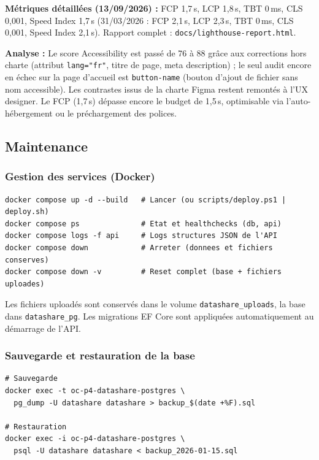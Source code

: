 \documentclass[12pt,a4paper]{article}
\begin{document}
\textbf{M\'etriques d\'etaill\'ees (13/09/2026) :} FCP 1,7\,s, LCP 1,8\,s, TBT 0\,ms, CLS 0,001, Speed Index 1,7\,s (31/03/2026 : FCP 2,1\,s, LCP 2,3\,s, TBT 0\,ms, CLS 0,001, Speed Index 2,1\,s). Rapport complet : \texttt{docs/lighthouse-report.html}.

\textbf{Analyse :} Le score Accessibility est pass\'e de 76 \`a 88 gr\^ace aux corrections hors charte (attribut \texttt{lang="fr"}, titre de page, meta description) ; le seul audit encore en \'echec sur la page d'accueil est \texttt{button-name} (bouton d'ajout de fichier sans nom accessible). Les contrastes issus de la charte Figma restent remont\'es \`a l'UX designer. Le FCP (1,7\,s) d\'epasse encore le budget de 1,5\,s, optimisable via l'auto-h\'ebergement ou le pr\'echargement des polices.


\subsection{Maintenance}

\subsubsection{Gestion des services (Docker)}

\begin{lstlisting}
docker compose up -d --build   # Lancer (ou scripts/deploy.ps1 | deploy.sh)
docker compose ps              # Etat et healthchecks (db, api)
docker compose logs -f api     # Logs structures JSON de l'API
docker compose down            # Arreter (donnees et fichiers conserves)
docker compose down -v         # Reset complet (base + fichiers uploades)
\end{lstlisting}

Les fichiers upload\'es sont conserv\'es dans le volume \texttt{datashare\_uploads}, la base dans \texttt{datashare\_pg}. Les migrations EF Core sont appliqu\'ees automatiquement au d\'emarrage de l'API.

\subsubsection{Sauvegarde et restauration de la base}

\begin{lstlisting}
# Sauvegarde
docker exec -t oc-p4-datashare-postgres \
  pg_dump -U datashare datashare > backup_$(date +%F).sql

# Restauration
docker exec -i oc-p4-datashare-postgres \
  psql -U datashare datashare < backup_2026-01-15.sql
\end{lstlisting}
\end{document}
